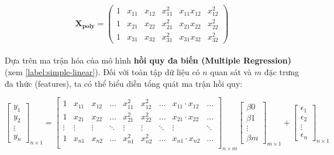 $$
\mathbf{X_{poly}} =
\begin{pmatrix}
  1 & x_{11} & x_{12} & x_{11}^2 & x_{11}x_{12} & x_{12}^2 \\
  1 & x_{21} & x_{22} & x_{21}^2 & x_{21}x_{22} & x_{22}^2 \\
  1 & x_{31} & x_{32} & x_{31}^2 & x_{31}x_{32} & x_{32}^2
\end{pmatrix}
$$

\paragraph{}{Dựa trên ma trận hóa của mô hình \textbf{hồi quy đa biến (Multiple Regression)} (xem \ref{label:simple-linear}). Đối với toàn tập dữ liệu có $n$ quan sát và $m$ đặc trưng đa thức (features), ta có thể biểu diễn tổng quát ma trận hồi quy:}

\begin{equation}
    \begin{bmatrix}
        y_1 \\
        y_2 \\
        \vdots \\
        y_n
    \end{bmatrix}
    _{\text{$n \times 1$}}
    = 
    \begin{bmatrix}
        1 & x_{11} & x_{12} & \dots & x_{11}^2 & x_{12}^2 & \dots & x_{11} \cdot x_{12} & \dots\\
        1 & x_{21} & x_{22} & \dots & x_{21}^2 & x_{22}^2 & \dots & x_{21} \cdot x_{22} & \dots \\
        \vdots & \vdots & \vdots & \ddots & \vdots & \vdots & \ddots & \vdots & \ddots \\
        1 & x_{n1} & x_{n2} & \dots & x_{n1}^2 & x_{n2}^2 & \dots & x_{n1} \cdot x_{n2} & \dots \\
    \end{bmatrix}
    _{\text{$n \times m$}}
    \begin{bmatrix}
        \beta{0} \\
        \beta{1} \\
        \vdots \\
        \beta{m}
    \end{bmatrix}
    _{\text{$m \times 1$}}
    +
    \begin{bmatrix}
        \epsilon_{1} \\
        \epsilon_{2} \\
        \vdots \\
        \epsilon_{n}
    \end{bmatrix}
    _{\text{$n \times 1$}}
\end{equation}

